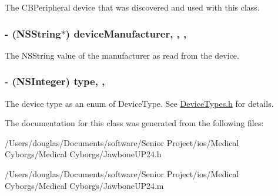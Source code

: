 The C\-B\-Peripheral device that was discovered and used with this class. \hypertarget{interface_jawbone_u_p24_af3f464123aa078ff318eecfba7bbcaf4}{
\subsubsection[{device\-Manufacturer}]{\setlength{\rightskip}{0pt plus 5cm}-\/ (N\-S\-String$\ast$) device\-Manufacturer\hspace{0.3cm}{\ttfamily [read]}, {\ttfamily [write]}, {\ttfamily [atomic]}, {\ttfamily [retain]}}}\label{interface_jawbone_u_p24_af3f464123aa078ff318eecfba7bbcaf4}
The N\-S\-String value of the manufacturer as read from the device. \hypertarget{interface_jawbone_u_p24_abd2f3cf19e5f5feeef6be3cf2193acce}{
\subsubsection[{type}]{\setlength{\rightskip}{0pt plus 5cm}-\/ (N\-S\-Integer) type\hspace{0.3cm}{\ttfamily [read]}, {\ttfamily [write]}, {\ttfamily [atomic]}}}\label{interface_jawbone_u_p24_abd2f3cf19e5f5feeef6be3cf2193acce}
The device type as an enum of Device\-Type. See \hyperlink{_device_types_8h_source}{Device\-Types.\-h} for details. 

The documentation for this class was generated from the following files\-:\begin{DoxyCompactItemize}
\item 
/\-Users/douglas/\-Documents/software/\-Senior Project/ios/\-Medical Cyborgs/\-Medical Cyborgs/Jawbone\-U\-P24.\-h\item 
/\-Users/douglas/\-Documents/software/\-Senior Project/ios/\-Medical Cyborgs/\-Medical Cyborgs/Jawbone\-U\-P24.\-m\end{DoxyCompactItemize}
